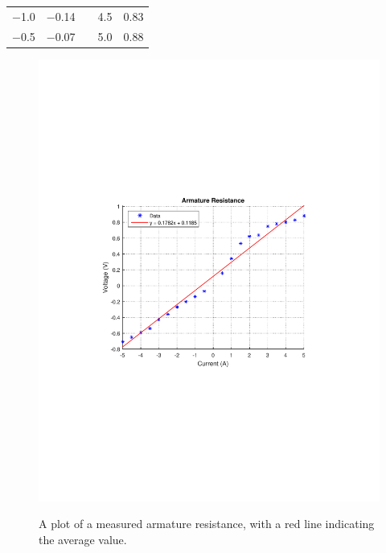 \begin{table}[H]
\begin{tabular}{|l|l|l| l|l|}
\cline{1-2}\cline{4-5}%
  \SI{-1,0}{}               &            \SI{-0,14}{}  &             & \SI{4,5}{} & \SI{0,83}{}             \\
\cline{1-2}\cline{4-5}%
  \SI{-0,5}{}               &            \SI{-0,07}{}  &             & \SI{5,0}{}                & \SI{0,88}{}             \\
\cline{1-2}\cline{4-5}%
\end{tabular}
\end{table}

\begin{figure}[H]
  \centering
  {
    \includegraphics[width=\textwidth]{figures/armatureResistance.pdf}
  }
  \caption{A plot of a measured armature resistance, with a red line indicating the average value.}
  \label{armatureResistance}
\end{figure}\vspace{-5mm}

